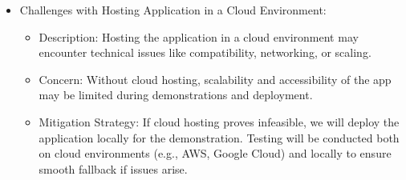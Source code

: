 \documentclass{article}
\begin{document}
\begin{itemize}
    \item Challenges with Hosting Application in a Cloud Environment:
    \begin{itemize}
        \item Description: Hosting the application in a cloud environment may encounter technical issues like compatibility, networking, or scaling.
        \item Concern: Without cloud hosting, scalability and accessibility of the app may be limited during demonstrations and deployment.
        \item Mitigation Strategy: If cloud hosting proves infeasible, we will deploy the application locally for the demonstration. Testing will be conducted both on cloud environments (e.g., AWS, Google Cloud) and locally to ensure smooth fallback if issues arise.
    \end{itemize}
\end{itemize}
\end{document}
